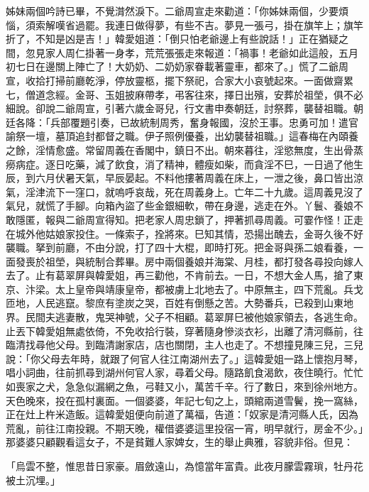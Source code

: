 \begin{showcontents}{}
姊妹兩個吟詩已畢，不覺潸然淚下。二爺周宣走來勸道：「你姊妹兩個，少要煩惱，須索解嘆省過罷。我連日做得夢，有些不吉。夢見一張弓，掛在旗竿上；旗竿折了，不知是凶是吉！」韓愛姐道：「倒只怕老爺邊上有些說話！」正在猶疑之間，忽見家人周仁掛著一身孝，荒荒張張走來報道：「禍事！老爺如此這般，五月初七日在邊關上陣亡了！大奶奶、二奶奶家眷載著靈車，都來了。」慌了二爺周宣，收拾打掃前廳乾淨，停放靈柩，擺下祭祀，合家大小哀號起來。一面做齋累七，僧道念經。金哥、玉姐披麻帶孝，弔客往來，擇日出殯，安葬於祖塋，俱不必細說。卻說二爺周宣，引著六歲金哥兒，行文書申奏朝廷，討祭葬，襲替祖職。朝廷各降：「兵部覆題引奏，已故統制周秀，奮身報國，沒於王事。忠勇可加！遣官諭祭一壇，墓頂追封都督之職。伊子照例優養，出幼襲替祖職。」這春梅在內頤養之餘，淫情愈盛。常留周義在香閣中，鎮日不出。朝來暮往，淫慾無度，生出骨蒸癆病症。逐日吃藥，減了飲食，消了精神，體瘦如柴，而貪淫不巳，一日過了他生辰，到六月伏暑天氣，早辰晏起。不料他摟著周義在床上，一泄之後，鼻口皆出涼氣，淫津流下一窪口，就嗚呼哀哉，死在周義身上。亡年二十九歲。這周義見沒了氣兒，就慌了手腳。向箱內盜了些金銀細軟，帶在身邊，逃走在外。丫鬟、養娘不敢隱匿，報與二爺周宣得知。把老家人周忠鎖了，押著抓尋周義。可霎作怪！正走在城外他姑娘家投住。一條索子，拴將來。巳知其情，恐揚出醜去，金哥久後不好襲職。拏到前廳，不由分說，打了四十大棍，即時打死。把金哥與孫二娘看養，一面發喪於祖塋，與統制合葬畢。房中兩個養娘并海棠、月桂，都打發各尋投向嫁人去了。止有葛翠屏與韓愛姐，再三勸他，不肯前去。一日，不想大金人馬，搶了東京、汴梁。太上皇帝與靖康皇帝，都被虜上北地去了。中原無主，四下荒亂。兵戈匝地，人民逃竄。黎庶有塗炭之哭，百姓有倒懸之苦。大勢番兵，已殺到山東地界。民間夫逃妻散，鬼哭神號，父子不相顧。葛翠屏巳被他娘家領去，各逃生命。止丟下韓愛姐無處依倚，不免收拾行裝，穿著隨身慘淡衣衫，出離了清河縣前，往臨清找尋他父母。到臨清謝家店，店也關閉，主人也走了。不想撞見陳三兒，三兒說：「你父母去年時，就跟了何官人往江南湖州去了。」這韓愛姐一路上懷抱月琴，唱小詞曲，往前抓尋到湖州何官人家，尋着父母。隨路飢食渴飲，夜住曉行。忙忙如喪家之犬，急急似漏網之魚，弓鞋又小，萬苦千辛。行了數日，來到徐州地方。天色晚來，投在孤村裏面。一個婆婆，年記七旬之上，頭綰兩道雪鬢，挽一窩絲，正在灶上杵米造飯。這韓愛姐便向前道了萬福，告道：「奴家是清河縣人氏，因為荒亂，前往江南投親。不期天晚，權借婆婆這里投宿一宵，明早就行，房金不少。」那婆婆只顧觀看這女子，不是貧難人家婢女，生的舉止典雅，容貌非俗。但見：

「烏雲不整，惟思昔日家豪。眉斂遠山，為憶當年富貴。此夜月朦雲霧瑣，牡丹花被土沉埋。」


\end{showcontents}
